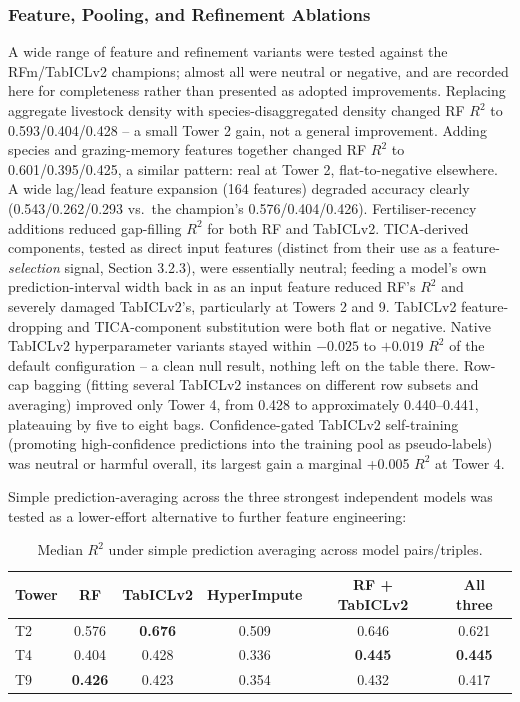 \subsubsection{Feature, Pooling, and Refinement Ablations}

A wide range of feature and refinement variants were tested against the RFm/TabICLv2 champions;
almost all were neutral or negative, and are recorded here for completeness rather than presented as
adopted improvements. Replacing aggregate livestock density with species-disaggregated density
changed RF $R^2$ to 0.593/0.404/0.428 -- a small Tower 2 gain, not a general improvement. Adding
species and grazing-memory features together changed RF $R^2$ to 0.601/0.395/0.425, a similar
pattern: real at Tower 2, flat-to-negative elsewhere. A wide lag/lead feature expansion (164
features) degraded accuracy clearly (0.543/0.262/0.293 vs.\ the champion's 0.576/0.404/0.426).
Fertiliser-recency additions reduced gap-filling $R^2$ for both RF and TabICLv2. TICA-derived
components, tested as direct input features (distinct from their use as a feature-\emph{selection}
signal, Section 3.2.3), were essentially neutral; feeding a model's own prediction-interval width
back in as an input feature reduced RF's $R^2$ and severely damaged TabICLv2's, particularly at
Towers 2 and 9. TabICLv2 feature-dropping and TICA-component substitution were both flat or
negative. Native TabICLv2 hyperparameter variants stayed within $-0.025$ to $+0.019$ $R^2$ of the
default configuration -- a clean null result, nothing left on the table there. Row-cap bagging (fitting
several TabICLv2 instances on different row subsets and averaging) improved only Tower 4, from
0.428 to approximately 0.440--0.441, plateauing by five to eight bags. Confidence-gated TabICLv2
self-training (promoting high-confidence predictions into the training pool as pseudo-labels) was
neutral or harmful overall, its largest gain a marginal +0.005 $R^2$ at Tower 4.

Simple prediction-averaging across the three strongest independent models was tested as a
lower-effort alternative to further feature engineering:

\begin{table}[h]
\centering
\begin{tabular}{lccccc}
\toprule
Tower & RF & TabICLv2 & HyperImpute & RF + TabICLv2 & All three \\
\midrule
T2 & 0.576 & \textbf{0.676} & 0.509 & 0.646 & 0.621 \\
T4 & 0.404 & 0.428 & 0.336 & \textbf{0.445} & \textbf{0.445} \\
T9 & \textbf{0.426} & 0.423 & 0.354 & 0.432 & 0.417 \\
\bottomrule
\end{tabular}
\caption{Median $R^2$ under simple prediction averaging across model pairs/triples.}
\end{table}

